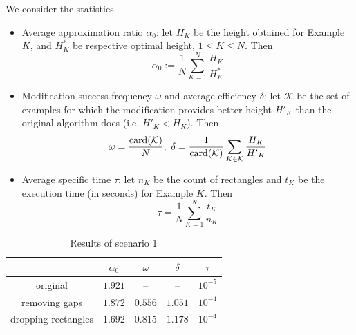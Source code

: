 \documentclass{article}
\theoremstyle{definition}
\theoremstyle{theorem}
\numberwithin{proposition}{section}
\begin{document}
    We consider the statistics
    \begin{itemize}
        \item
            Average approximation ratio $\alpha_0$: let $H_K$ be the height obtained for Example $K$, and $H^{*}_K$ be respective optimal height, $1\leq K\leq N$. Then
            \begin{equation*}
                \alpha_0:=\frac{1}{N}\sum_{K=1}^{N}\frac{H_K}{H^{*}_K}
            \end{equation*}
        \item
            Modification success frequency $\omega$ and average efficiency $\delta$: let $\mathcal{K}$ be the set of examples for which the modification provides better height ${H'}_K$ than the original algorithm does (i.e. ${H'}_K < H_K$). Then
            \begin{equation*}
                \omega=\frac{{\rm card}(\mathcal{K})}{N},~\delta=\frac{1}{{\rm card}(\mathcal{K})}\sum_{K\in\mathcal{K}}\frac{H_K}{{H'}_{K}}
            \end{equation*}
        \item
            Average specific time $\tau$: let $n_K$ be the count of rectangles and $t_K$ be the execution time (in seconds) for Example $K$. Then
            \begin{equation*}
                \tau = \frac{1}{N}\sum_{K=1}^{N}\frac{t_K}{n_K}
            \end{equation*}
    \end{itemize}
    \begin{table}[H]
        \begin{center}
            \begin{tabular}{|c|c|c|c|c|} 
                 \hline
                  & $\alpha_0$ & $\omega$ & $\delta$ & $\tau$ \\  
                 \hline
                 original & $1.921$ & -- & -- & $10^{-5}$ \\ 
                 \hline
                 removing gaps & $1.872$ & $0.556$ & $1.051$ & $10^{-4}$ \\
                 \hline
                 dropping rectangles & $1.692$ & $0.815$ & $1.178$ & $10^{-4}$ \\
                 \hline
            \end{tabular}
            \caption{Results of scenario 1}
        \end{center}
    \end{table}
\end{document}

